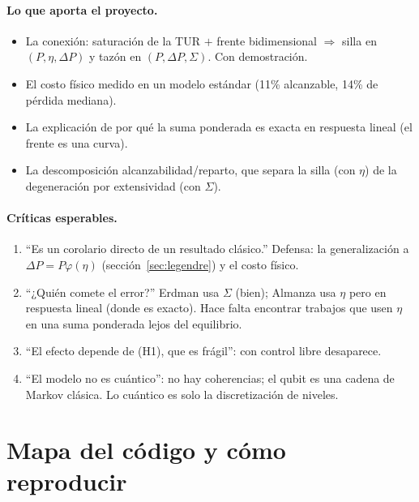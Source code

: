 \paragraph{Lo que aporta el proyecto.}
\begin{itemize}
\item La conexión: saturación de la TUR $+$ frente bidimensional $\Rightarrow$ silla en $(P,\eta,\Delta P)$
  y tazón en $(P,\Delta P,\Sigma)$. Con demostración.
\item El costo físico medido en un modelo estándar (11\% alcanzable, 14\% de pérdida mediana).
\item La explicación de por qué la suma ponderada es exacta en respuesta lineal (el frente es una
  curva).
\item La descomposición alcanzabilidad/reparto, que separa la silla (con $\eta$) de la degeneración
  por extensividad (con $\Sigma$).
\end{itemize}

\paragraph{Críticas esperables.}
\begin{enumerate}
\item ``Es un corolario directo de un resultado clásico.'' Defensa: la generalización a
  $\Delta P = P\varphi(\eta)$ (sección~\ref{sec:legendre}) y el costo físico.
\item ``¿Quién comete el error?'' Erdman usa $\Sigma$ (bien); Almanza usa $\eta$ pero en respuesta
  lineal (donde es exacto). Hace falta encontrar trabajos que usen $\eta$ en una suma ponderada
  lejos del equilibrio.
\item ``El efecto depende de (H1), que es frágil'': con control libre desaparece.
\item ``El modelo no es cuántico'': no hay coherencias; el qubit es una cadena de Markov clásica. Lo
  cuántico es solo la discretización de niveles.
\end{enumerate}

\section{Mapa del código y cómo reproducir}

